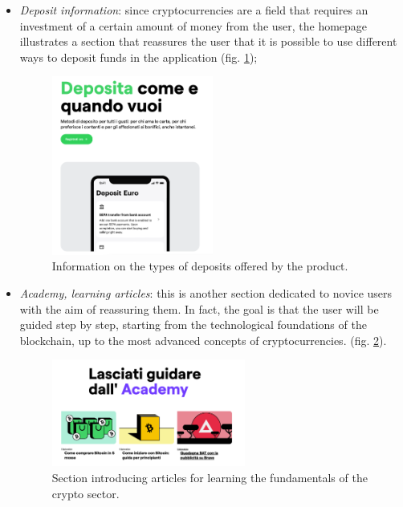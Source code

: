 \begin{itemize}
  \item \textit{Deposit information}: since cryptocurrencies are a field 
  that requires an investment of a certain amount of money from the user, 
  the homepage illustrates a section that reassures the user that it is 
  possible to use different ways to deposit funds in the application 
  (fig. \ref{fig:deposit-options});

  \begin{figure}[H]
    \centering
    \includegraphics[width=0.50\textwidth]{res/images/deposit-options.png}
    \caption{Information on the types of deposits offered by the product.}
    \label{fig:deposit-options}
  \end{figure}

  \item \textit{Academy, learning articles}: this is another section 
  dedicated to novice users with the aim of reassuring them. In fact, the 
  goal is that the user will be guided step by step, starting from the 
  technological foundations of the blockchain, up to the most advanced 
  concepts of cryptocurrencies. (fig. \ref{fig:academy}).

  \begin{figure}[H]
    \centering
    \includegraphics[width=0.60\textwidth]{res/images/academy.png}
    \caption{Section introducing articles for learning the fundamentals 
    of the crypto sector.}
    \label{fig:academy}
  \end{figure}
\end{itemize}

